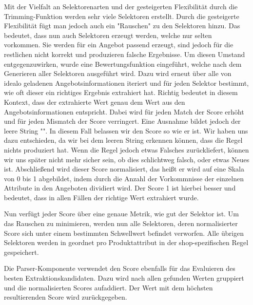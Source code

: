 Mit der Vielfalt an Selektorenarten und der gesteigerten Flexibilität durch die Trimming-Funktion werden sehr viele
Selektoren erstellt.
Durch die gesteigerte Flexibilität fügt man jedoch auch ein "Rauschen" zu den Selektoren hinzu.
Das bedeutet, dass nun auch Selektoren erzeugt werden, welche nur selten vorkommen.
Sie werden für ein Angebot passend erzeugt, sind jedoch für die restlichen nicht korrekt und produzieren falsche
Ergebnisse.
Um diesen Umstand entgegenzuwirken, wurde eine Bewertungsfunktion eingeführt, welche nach dem Generieren aller
Selektoren ausgeführt wird.
Dazu wird erneut über alle von idealo geladenen Angebotsinformationen iteriert und für jeden Selektor bestimmt, wie
oft dieser ein richtiges Ergebnis extrahiert hat.
Richtig bedeutet in diesem Kontext, dass der extrahierte Wert genau dem Wert aus den Angebotsinformationen entspricht.
Dabei wird für jeden Match der Score erhöht und für jeden Mismatch der Score verringert.
Eine Ausnahme bildet jedoch der leere String "".
In diesem Fall belassen wir den Score so wie er ist.
Wir haben uns dazu entschieden, da wir bei dem leeren String erkennen können, dass die Regel nichts produziert hat.
Wenn die Regel jedoch etwas Falsches zurückliefert, können wir uns später nicht mehr sicher sein, ob dies schlichtweg
falsch, oder etwas Neues ist.
Abschließend wird dieser Score normalisiert, das heißt er wird auf eine Skala von 0 bis 1 abgebildet, indem durch die
Anzahl der Vorkommnisse der einzelnen Attribute in den Angeboten dividiert wird.
Der Score 1 ist hierbei besser und bedeutet, dass in allen Fällen der richtige Wert extrahiert wurde.

Nun verfügt jeder Score über eine genaue Metrik, wie gut der Selektor ist.
Um das Rauschen zu minimieren, werden nun alle Selektoren, deren normalisierter Score sich unter einem bestimmten
Schwellwert befindet verworfen.
Alle übrigen Selektoren werden in geordnet pro Produktattribut in der shop-spezifischen Regel gespeichert.

Die Parser-Komponente verwendet den Score ebenfalls für das Evaluieren des besten Extraktionskandidaten.
Dazu wird nach allen gefunden Werten gruppiert und die normalisierten Scores aufaddiert.
Der Wert mit dem höchsten resultierenden Score wird zurückgegeben.